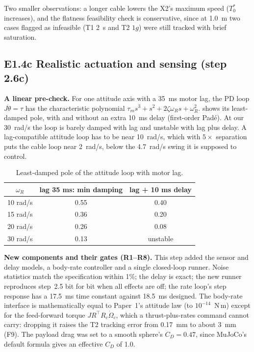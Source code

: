 \documentclass[11pt,a4paper]{article}
\begin{document}
Two smaller observations: a longer cable lowers the X2's maximum speed ($T_0^\ast$ increases), and the flatness
feasibility check is conservative, since at 1.0~m two cases flagged as infeasible (T1 2~s and T2 $1g$) were still tracked
with brief saturation.

\subsection{E1.4c Realistic actuation and sensing (step 2.6c)}

\textbf{A linear pre-check.} For one attitude axis with a 35~ms motor lag, the PD loop $J\ddot\theta = \tau$ has the
characteristic polynomial $\tau_m s^3 + s^2 + 2\zeta\omega_R s + \omega_R^2$.  shows its least-damped
pole, with and without an extra 10~ms delay (first-order Pad\'e). At our 30~rad/s the loop is barely damped with lag and
unstable with lag plus delay. A lag-compatible attitude loop has to be near 10~rad/s, which with $5\times$ separation puts
the cable loop near 2~rad/s, below the 4.7~rad/s swing it is supposed to control.

\begin{table}[htbp]
\centering\small
\begin{tabular}{@{}ccc@{}}
\toprule
$\omega_R$ & lag 35 ms: min damping & lag + 10 ms delay \\
\midrule
10 rad/s & 0.55 & 0.40 \\
15 rad/s & 0.36 & 0.20 \\
20 rad/s & 0.26 & 0.08 \\
30 rad/s & 0.13 & unstable \\
\bottomrule
\end{tabular}
\caption{Least-damped pole of the attitude loop with motor lag.}
\label{tab:lag}
\end{table}

\textbf{New components and their gates (R1--R8).} This step added the sensor and delay models, a body-rate controller and
a single closed-loop runner. Noise statistics match the specification within 1\%; the delay is exact; the new runner
reproduces step~2.5 bit for bit when all effects are off; the rate loop's step response has a 17.5~ms time constant
against 18.5~ms designed. The body-rate interface is mathematically equal to Paper~1's attitude law
(to $10^{-14}$~N\,m) except for the feed-forward torque $J R^\top R_c\dot\Omega_c$, which a thrust-plus-rates command
cannot carry: dropping it raises the T2 tracking error from 0.17~mm to about 3~mm (F9). The payload drag was set to a
smooth sphere's $C_D = 0.47$, since MuJoCo's default formula gives an effective $C_D$ of 1.0.
\end{document}
